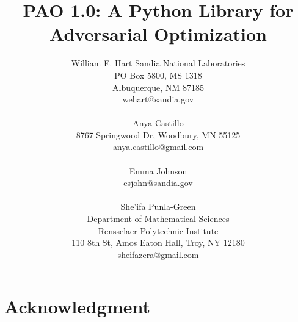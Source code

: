\documentclass[pdf,12pt,article,relax]{SANDreport}
\title{PAO 1.0: A Python Library for Adversarial Optimization}
\author{William E. Hart
            Sandia National Laboratories\\
           PO Box 5800, MS 1318 \\
           Albuquerque, NM 87185 \\
           wehart@sandia.gov\\
\\
        Anya Castillo\\
            8767 Springwood Dr, Woodbury, MN 55125\\
            anya.castillo@gmail.com\\
\\
        Emma Johnson\\
           esjohn@sandia.gov\\
\\
        She'ifa Punla-Green\\
        Department of Mathematical Sciences\\
        Rensselaer Polytechnic Institute\\
        110 8th St, Amos Eaton Hall, Troy, NY 12180\\
        sheifazera@gmail.com
        }
\date{}
\begin{document}

    \maketitle

    \begin{abstract}
	
    \end{abstract}


    \clearpage
    \section*{Acknowledgment}
	






\end{document}

